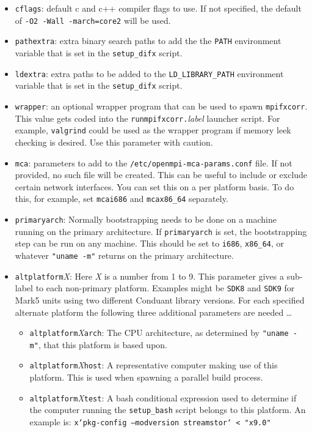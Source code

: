 \begin{itemize}
\item {\tt cflags}: default c and c++ compiler flags to use.
If not specified, the default of {\tt -O2 -Wall -march=core2} will be used.

\item {\tt pathextra}: extra binary search paths to add the the {\tt PATH} environment variable that is set in the {\tt setup\_difx} script.

\item {\tt ldextra}: extra paths to be added to the {\tt LD\_LIBRARY\_PATH} environment variable that is set in the {\tt setup\_difx} script.

\item {\tt wrapper}: an optional wrapper program that can be used to spawn {\tt mpifxcorr}.
This value gets coded into the {\tt runmpifxcorr.}{\em label} launcher script.
For example, {\tt valgrind} could be used as the wrapper program if memory leek checking is desired.
Use this parameter with caution.

\item {\tt mca}: parameters to add to the {\tt /etc/openmpi-mca-params.conf} file.
If not provided, no such file will be created.
This can be useful to include or exclude certain network interfaces.
You can set this on a per platform basis.
To do this, for example, set {\tt mcai686} and {\tt mcax86\_64} separately.

\item {\tt primaryarch}: Normally bootstrapping needs to be done on a machine running on the primary architecture.
If {\tt primaryarch} is set, the bootstrapping step can be run on any machine.
This should be set to {\tt i686}, {\tt x86\_64}, or whatever {\tt "uname -m"} returns on the primary architecture.

\item {\tt altplatform}{\em X}: Here {\em X} is a number from 1 to 9.
This parameter gives a sub-label to each non-primary platform.
Examples might be {\tt SDK8} and {\tt SDK9} for Mark5 units using two different Conduant library versions.
For each specified alternate platform the following three additional parameters are needed \ldots

\begin{itemize}
\item {\tt altplatform}{\em X}{\tt arch}: The CPU architecture, as determined by {\tt "uname -m"}, that this platform is based upon.

\item {\tt altplatform}{\em X}{\tt host}: A representative computer making use of this platform.
This is used when spawning a parallel build process.

\item {\tt altplatform}{\em X}{\tt test}: A bash conditional expression used to determine if the computer running the {\tt setup\_bash} script belongs to this platform.
An example is: {\tt x`pkg-config --modversion streamstor` < "x9.0"}

\end{itemize}
\end{itemize}



